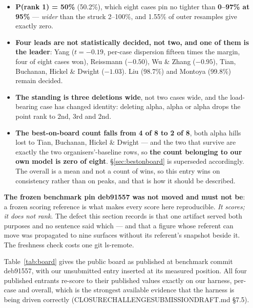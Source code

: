 \documentclass[11pt,a4paper]{article}
\newcommand{\breakus}{\textunderscore\allowbreak}
\newcommand{\code}[1]{{\small\ttfamily\let\_\breakus #1}}
\newcommand{\artifact}[1]{{\footnotesize\ttfamily\let\_\breakus #1}}
\begin{document}
\begin{itemize}\itemsep2pt
\item \textbf{P(rank 1) = 50\%} (50.2\%), which eight cases pin no tighter than
  \textbf{0--97\% at 95\%} --- \emph{wider} than the struck 2--100\%, and 1.55\% of outer
  resamples give exactly zero.
\item \textbf{Four leads are not statistically decided, not two, and one of them is the
  leader}: Yang ($t=-0.19$, per-case dispersion fifteen times the margin, four of eight
  cases won), Reissmann ($-0.50$), Wu \& Zhang ($-0.95$), Tian, Buchanan, Hickel \& Dwight
  ($-1.03$). Liu (98.7\%) and Montoya (99.8\%) remain decided.
\item \textbf{The standing is three deletions wide}, not two cases wide, and the
  load-bearing case has changed identity: deleting \code{alpha\_15\_13929\_4048},
  \code{alpha\_15\_13929\_2024} or \code{alpha\_05\_4071\_4048} drops the point rank to
  2nd, 3rd and 2nd.
\item \textbf{The best-on-board count falls from 4 of 8 to 2 of 8}, both \code{alpha\_15}
  hills lost to Tian, Buchanan, Hickel \& Dwight --- and the two that survive are exactly
  the two organisers'-baseline rows, so \textbf{the count belonging to our own model is
  zero of eight}. \S\ref{sec:bestonboard} is superseded accordingly. The overall is a mean
  and not a count of wins, so this entry wins on consistency rather than on peaks, and that
  is how it should be described.
\end{itemize}

\textbf{The frozen benchmark pin \code{deb91557} was not moved and must not be}: a frozen
scoring reference is what makes every score here reproducible. \emph{It scores; it does not
rank.} The defect this section records is that one artifact served both purposes and no
sentence said which --- and that a figure whose referent can move was propagated to nine
surfaces without its referent's snapshot beside it. The freshness check costs one
\code{git ls-remote}.

Table~\ref{tab:board} gives the public board as published at benchmark commit
\code{deb91557}, with our unsubmitted entry inserted at its measured position. All four
published entrants re-score to their published values exactly on our harness, per-case and
overall, which is the strongest available evidence that the harness is being driven
correctly (\artifact{CLOSURE\_CHALLENGE\_SUBMISSION\_DRAFT.md} \S7.5).
\end{document}
